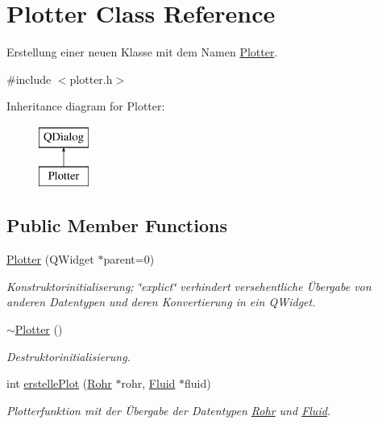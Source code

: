 \hypertarget{class_plotter}{}\section{Plotter Class Reference}
\label{class_plotter}


Erstellung einer neuen Klasse mit dem Namen \hyperlink{class_plotter}{Plotter}.  




{\ttfamily \#include $<$plotter.\+h$>$}

Inheritance diagram for Plotter\+:\begin{figure}[H]
\begin{center}
\leavevmode
\includegraphics[height=2.000000cm]{class_plotter}
\end{center}
\end{figure}
\subsection*{Public Member Functions}
\begin{DoxyCompactItemize}
\item 
\hyperlink{class_plotter_a367b6890c36910a27ec710ac3693e64b}{Plotter} (Q\+Widget $\ast$parent=0)
\begin{DoxyCompactList}\small\item\em Konstruktorinitialiserung; \char`\"{}explict\char`\"{} verhindert versehentliche Übergabe von anderen Datentypen und deren Konvertierung in ein Q\+Widget. \end{DoxyCompactList}\item 
\hyperlink{class_plotter_acd0883f9597a6b3bfcca0fce926809a0}{$\sim$\+Plotter} ()
\begin{DoxyCompactList}\small\item\em Destruktorinitialisierung. \end{DoxyCompactList}\item 
int \hyperlink{class_plotter_a4808217f2ec95082cee4c239b707fcc3}{erstelle\+Plot} (\hyperlink{class_rohr}{Rohr} $\ast$rohr, \hyperlink{class_fluid}{Fluid} $\ast$fluid)
\begin{DoxyCompactList}\small\item\em Plotterfunktion mit der Übergabe der Datentypen \hyperlink{class_rohr}{Rohr} und \hyperlink{class_fluid}{Fluid}. \end{DoxyCompactList}\end{DoxyCompactItemize}


